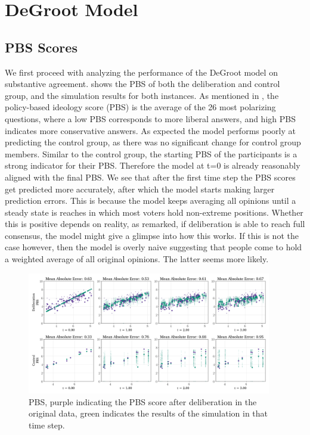 \section{DeGroot Model} \label{degroot_results} \subsection{PBS Scores} We
first proceed with analyzing the performance of the DeGroot model on
substantive agreement.  shows the PBS of both the
deliberation and control group, and the simulation results for both instances.
As mentioned in , the policy-based ideology score (PBS) is the
average of the 26 most polarizing questions, where a low PBS corresponds to
more liberal answers, and high PBS indicates more conservative answers. As
expected the model performs poorly at predicting the control group, as there
was no significant change for control group members. Similar to the control
group, the starting  PBS of the participants is a strong indicator for
their  PBS. Therefore the model at t=0 is already reasonably aligned with
the final  PBS. We see that after the first time step the PBS scores get
predicted more accurately, after which the model starts making larger
prediction errors. This is because the model keeps averaging all opinions until
a steady state is reaches in which most voters hold non-extreme positions.
Whether this is positive depends on reality, as
\citet{elsterMARKETFORUMThree2002} remarked, if deliberation is able to reach
full consensus, the model might give a glimpse into how this works. If this is
not the case however, then the model is overly naive suggesting that people
come to hold a weighted average of all original opinions. The latter seems more
likely.


\begin{figure}[h]
	\begin{center}
		\includegraphics[width=0.95\textwidth]{Figures/pbs_scores.png}
	\end{center}
	\caption{ PBS, purple indicating the PBS score after deliberation in the original data, green indicates the results of the simulation in that time step.}\label{fig:pbs}
\end{figure}

